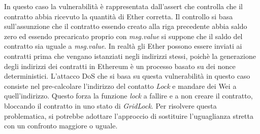 \documentclass[../../Thesis.tex]{subfiles}
\begin{document}
In questo caso la vulnerabilità è rappresentata dall'assert che controlla che il contratto abbia ricevuto la quantità di Ether corretta. Il controllo si basa sull'assunzione che il contratto essendo creato alla riga precedente abbia saldo zero ed essendo precaricato proprio con \emph{msg.value} si suppone che il saldo del contratto sia uguale a \emph{msg.value}. In realtà gli Ether possono essere inviati ai contratti prima che vengano istanziati negli indirizzi stessi, poichè la generazione degli indirizzi dei contratti in Ethereum è un processo basato su dei nonce deterministici. L'attacco DoS che si basa su questa vulnerabilità in questo caso consiste nel pre-calcolare l'indirizzo del contatto \emph{Lock} e mandare dei Wei a quell'indirizzo. Questo forza la funzione \emph{lock} a fallire e a non creare il contratto, bloccando il contratto in uno stato di \emph{GridLock}.  Per risolvere questa problematica, si potrebbe adottare l'approccio di sostituire l'uguaglianza stretta con un confronto maggiore o uguale. 
\end{document}
